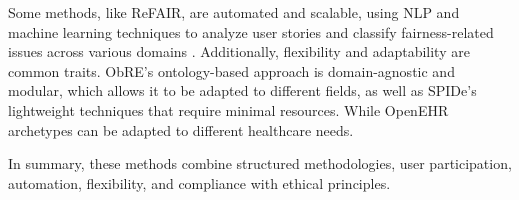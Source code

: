Some methods, like ReFAIR, are automated and scalable, using NLP and machine learning techniques to analyze user stories and classify fairness-related issues across various domains \cite{10.1145/3597503.3639185}. Additionally, flexibility and adaptability are common traits.
ObRE's ontology-based approach is domain-agnostic and modular, which allows it to be adapted to different fields, as well as SPIDe's lightweight techniques that require minimal resources. While OpenEHR archetypes can be adapted to 
different healthcare needs.

In summary, these methods combine structured methodologies, user participation, automation, flexibility, and compliance with ethical principles.

\begin{table}[ht]
  \centering
  \caption{RQ3: Characteristics of the Approaches}
  \label{tab:selected_papers_RQ3}
  \end{table}


